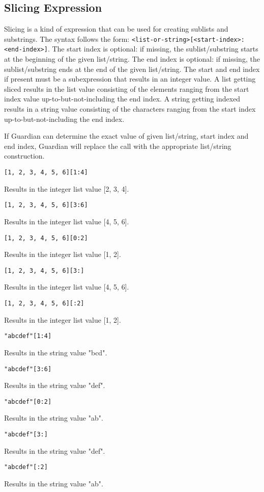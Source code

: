 
\subsection{Slicing Expression}
{
	Slicing is a kind of expression that can be used for creating sublists
	and substrings. The syntax follows the
	form: \texttt{<list-or-string>[<start-index>:<end-index>]}.
	The start index is optional: if missing, the sublist/substring starts at
	the beginning of the given list/string.
	The end index is optional: if missing, the sublist/substring ends at
	the end of the given list/string.
	The start and end index if present must be a subexpression that results
	in an integer value.
	A list getting sliced results in the list value consisting of the elements
	ranging from the start index value up-to-but-not-including the end index.
	A string getting indexed results in a string value consisting of the
	characters ranging from the start index up-to-but-not-including the end
	index.
	
	If Guardian can determine the exact value of given list/string,
	start index and end index, Guardian
	will replace the call with the appropriate list/string construction.
	
	\begin{itemize}
	{
		\item \texttt{[1, 2, 3, 4, 5, 6][1:4]}
		
			Results in the integer list value [2, 3, 4].
		
		\item \texttt{[1, 2, 3, 4, 5, 6][3:6]}
		
			Results in the integer list value [4, 5, 6].
		
		\item \texttt{[1, 2, 3, 4, 5, 6][0:2]}
		
			Results in the integer list value [1, 2].
		
		\item \texttt{[1, 2, 3, 4, 5, 6][3:]}
		
			Results in the integer list value [4, 5, 6].
		
		\item \texttt{[1, 2, 3, 4, 5, 6][:2]}
		
			Results in the integer list value [1, 2].
		
		\item \texttt{"abcdef"[1:4]}
		
			Results in the string value "bcd".
		
		\item \texttt{"abcdef"[3:6]}
		
			Results in the string value "def".
		
		\item \texttt{"abcdef"[0:2]}
		
			Results in the string value "ab".
			
		\item \texttt{"abcdef"[3:]}
		
			Results in the string value "def".
		
		\item \texttt{"abcdef"[:2]}
		
			Results in the string value "ab".
	}
	\end{itemize}
}














